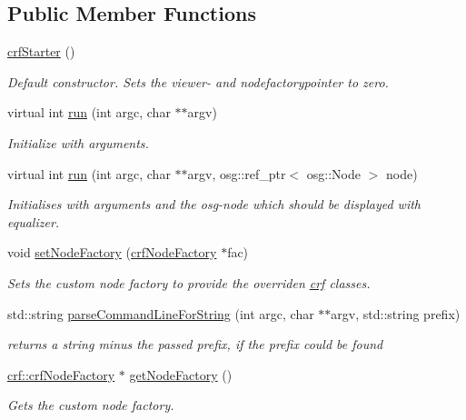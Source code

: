 \subsection*{Public Member Functions}
\begin{CompactItemize}
\item 
\hypertarget{a00007_e1d24d865b4c98f43163acafc3a48fce}{
\hyperlink{a00007_e1d24d865b4c98f43163acafc3a48fce}{crfStarter} ()}
\label{a00007_e1d24d865b4c98f43163acafc3a48fce}

\begin{CompactList}\small\item\em Default constructor. Sets the viewer- and nodefactorypointer to zero. \item\end{CompactList}\item 
virtual int \hyperlink{a00007_bff219a07f93750e4e6db09fd026de7f}{run} (int argc, char $\ast$$\ast$argv)
\begin{CompactList}\small\item\em Initialize with arguments. \item\end{CompactList}\item 
virtual int \hyperlink{a00007_20c31de1c50c6504a4aaa617d606715b}{run} (int argc, char $\ast$$\ast$argv, osg::ref\_\-ptr$<$ osg::Node $>$ node)
\begin{CompactList}\small\item\em Initialises with arguments and the osg-node which should be displayed with equalizer. \item\end{CompactList}\item 
void \hyperlink{a00007_317832b54784e7c2c21f5d6bda17cda3}{setNodeFactory} (\hyperlink{a00005}{crfNodeFactory} $\ast$fac)
\begin{CompactList}\small\item\em Sets the custom node factory to provide the overriden \hyperlink{a00043}{crf} classes. \item\end{CompactList}\item 
std::string \hyperlink{a00007_b74ff2cc944f29fb91262ab5a9fa084a}{parseCommandLineForString} (int argc, char $\ast$$\ast$argv, std::string prefix)
\begin{CompactList}\small\item\em returns a string minus the passed prefix, if the prefix could be found \item\end{CompactList}\item 
\hyperlink{a00005}{crf::crfNodeFactory} $\ast$ \hyperlink{a00007_6b14742d2d820eba786626ab044c7cbd}{getNodeFactory} ()
\begin{CompactList}\small\item\em Gets the custom node factory. \item\end{CompactList}\end{CompactItemize}


